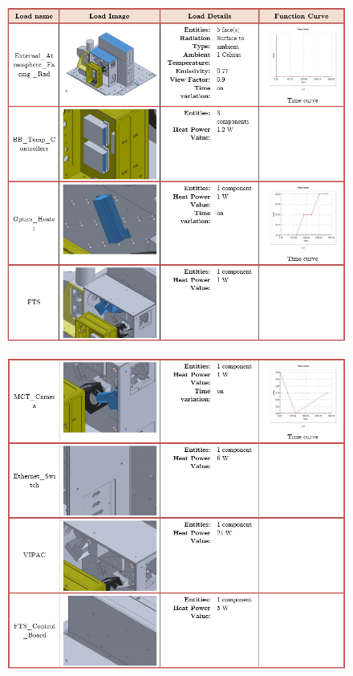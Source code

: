 \begin{figure}[h!]
    \centering
    \includegraphics[width=\textwidth]{thermal_load_images/ascent_pt2_TL_images/ascesnt_pt2_1.PNG}
\end{figure}

\begin{figure}
    \centering
    \includegraphics[width=\textwidth]{thermal_load_images/ascent_pt2_TL_images/ascesnt_pt2_2.png}
\end{figure}

